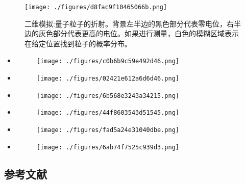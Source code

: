\begin{figure}[ht]
\centering
\texttt{[image: ./figures/d8fac9f10465066b.png]}
\caption{二维模拟:量子粒子的折射。背景左半边的黑色部分代表零电位，右半边的灰色部分代表更高的电位。如果进行测量，白色的模糊区域表示在给定位置找到粒子的概率分布。} \label{fig_ZS_10}
\end{figure}

\begin{itemize}
\item \begin{figure}[ht]
\centering
\texttt{[image: ./figures/c0b6b9c59e492d46.png]}
\caption\label{fig_ZS_11}
\end{figure}

\item \begin{figure}[ht]
\centering
\texttt{[image: ./figures/02421e612a6d6d46.png]}
\caption\label{fig_ZS_12}
\end{figure}

\item \begin{figure}[ht]
\centering
\texttt{[image: ./figures/6b568e3243a34215.png]}
\caption \label{fig_ZS_13}
\end{figure}

\item \begin{figure}[ht]
\centering
\texttt{[image: ./figures/44f8603543d51545.png]}
\caption\label{fig_ZS_14}
\end{figure}

\item \begin{figure}[ht]
\centering
\texttt{[image: ./figures/fad5a24e31040dbe.png]}
\caption \label{fig_ZS_15}
\end{figure}

\item \begin{figure}[ht]
\centering
\texttt{[image: ./figures/6ab74f7525c939d3.png]}
\caption \label{fig_ZS_16}
\end{figure}

\end{itemize}

\subsection{参考文献}

